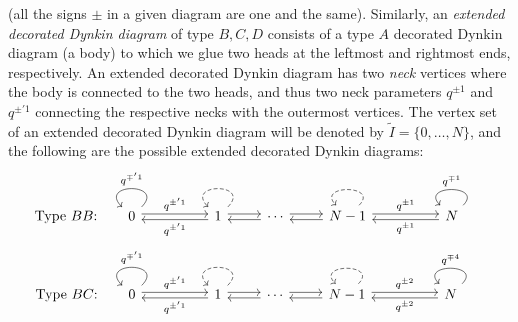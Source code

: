 \documentclass{amsart}
\begin{document}
\medskip 
\noindent (all the signs $\pm$ in a given diagram are one and the same). Similarly, an \emph{extended decorated Dynkin diagram} of type $B,C,D$ consists of a type $A$ decorated Dynkin diagram (a body) to which we glue two heads at the leftmost and rightmost ends, respectively. An extended decorated Dynkin diagram has two \emph{neck} vertices where the body is connected to the two heads, and thus two neck parameters $q^{\pm 1}$ and $q^{\pm' 1}$ connecting the respective necks with the outermost vertices. The vertex set of an extended decorated Dynkin diagram will be denoted by $\tilde{I} = \{0,\dots,N\}$, and the following are the possible extended decorated Dynkin diagrams:
\begin{equation}
\label{eqn:dynkin bb}
\text{Type $BB$:} \begin{tikzcd}
0 && 1 & \cdots & {N-1} && N
\arrow["q^{\pm 1}", shift left=2pt, from=1-7, to=1-5]
\arrow["q^{\pm 1}", shift left=2pt, from=1-5, to=1-7]
\arrow[shift left=2pt, from=1-5, to=1-4]
\arrow[shift left=2pt, from=1-4, to=1-5]
\arrow[shift left=2pt, from=1-4, to=1-3]
\arrow[shift left=2pt, from=1-3, to=1-4]
\arrow["q^{\pm' 1}", shift left=2pt, from=1-3, to=1-1]
\arrow["q^{\pm' 1}", shift left=2pt, from=1-1, to=1-3]
\arrow["q^{\mp 1}"', from=1-7, to=1-7, looseness=3.3]
\arrow[dashed, from=1-5, to=1-5, looseness=3.3]
\arrow[dashed, from=1-3, to=1-3, looseness=4.5]
\arrow["q^{\mp' 1}"', from=1-1, to=1-1, looseness=4.5]
\end{tikzcd}
\end{equation}
\begin{equation}
\label{eqn:dynkin bc}
\text{Type $BC$:} \begin{tikzcd}
0 && 1 & \cdots & {N-1} && N
\arrow["q^{\pm 2}", shift left=2pt, from=1-7, to=1-5]
\arrow["q^{\pm 2}", shift left=2pt, from=1-5, to=1-7]
\arrow[shift left=2pt, from=1-5, to=1-4]
\arrow[shift left=2pt, from=1-4, to=1-5]
\arrow[shift left=2pt, from=1-4, to=1-3]
\arrow[shift left=2pt, from=1-3, to=1-4]
\arrow["q^{\pm' 1}", shift left=2pt, from=1-3, to=1-1]
\arrow["q^{\pm' 1}", shift left=2pt, from=1-1, to=1-3]
\arrow["q^{\mp 4}"', from=1-7, to=1-7, looseness=3.3]
\arrow[dashed, from=1-5, to=1-5, looseness=3.3]
\arrow[dashed, from=1-3, to=1-3, looseness=4.5]
\arrow["q^{\mp' 1}"', from=1-1, to=1-1, looseness=4.5]
\end{tikzcd}
\end{equation}
\end{document}
